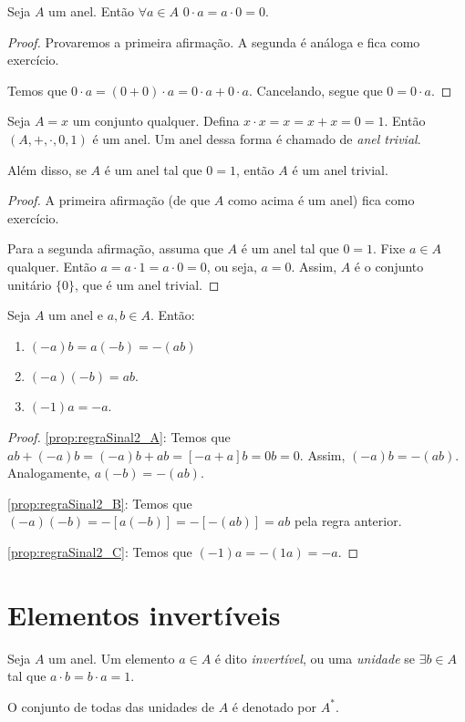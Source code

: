 \begin{prop}
    Seja $A$ um anel.
    Então $\forall a \in A$ $0 \cdot a = a \cdot 0 = 0$.
\end{prop}
\begin{proof}
Provaremos a primeira afirmação.
A segunda é análoga e fica como exercício.

Temos que $0\cdot a=(0+0)\cdot a=0\cdot a +0\cdot a$.
Cancelando, segue que $0=0\cdot a$.
\end{proof}

\begin{prop}
    Seja $A={x}$ um conjunto qualquer.
    Defina $x\cdot x=x=x+x=0=1$.
    Então $(A, +, \cdot, 0, 1)$ é um anel.
    Um anel dessa forma é chamado de \emph{anel trivial}.
    
    Além disso, se $A$ é um anel tal que $0=1$, então $A$ é um anel trivial.
\end{prop}
\begin{proof}
    A primeira afirmação (de que $A$ como acima é um anel) fica como exercício.

    Para a segunda afirmação, assuma que $A$ é um anel tal que $0=1$.
    Fixe $a \in A$ qualquer.
    Então $a=a\cdot1=a\cdot0=0$, ou seja, $a=0$.
    Assim, $A$ é o conjunto unitário $\{0\}$, que é um anel trivial.
\end{proof}

\begin{prop}\label{prop:regraSinal2}
    Seja $A$ um anel e $a, b \in A$. Então:
    \begin{enumerate}[label=\alph*)]
        \item $(-a)b=a(-b)=-(ab)$\label{prop:regraSinal2_A}
        \item $(-a)(-b)=ab$.\label{prop:regraSinal2_B}
        \item $(-1)a=-a$.\label{prop:regraSinal2_C}
    \end{enumerate}
\end{prop}
\begin{proof}
    \ref{prop:regraSinal2_A}: Temos que $ab+(-a)b=(-a)b+ab=[-a+a]b=0b=0$. Assim, $(-a)b=-(ab)$. Analogamente, $a(-b)=-(ab)$.

    \ref{prop:regraSinal2_B}: Temos que $(-a)(-b)=-[a(-b)]=-[-(ab)]=ab$ pela regra anterior.

    \ref{prop:regraSinal2_C}: Temos que $(-1)a=-(1a)=-a$.
\end{proof}

\section{Elementos invertíveis}
\begin{definition}
    Seja $A$ um anel.
    Um elemento $a \in A$ é dito \emph{invertível}, ou uma \emph{unidade} se $\exists b \in A$ tal que $a \cdot b = b \cdot a = 1$.
    
    O conjunto de todas das unidades de $A$ é denotado por $A^*$.
\end{definition}

